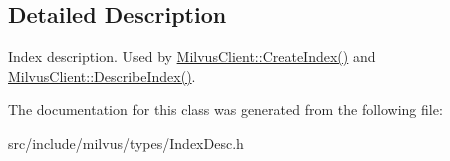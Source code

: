 \subsection{Detailed Description}
Index description. Used by \hyperlink{classmilvus_1_1_milvus_client_a9d56f35a497504a7dee610d368d22b7a}{Milvus\+Client\+::\+Create\+Index()} and \hyperlink{classmilvus_1_1_milvus_client_a58ed7015339719ab8dc7d6acad90d9a1}{Milvus\+Client\+::\+Describe\+Index()}. 

The documentation for this class was generated from the following file\+:\begin{DoxyCompactItemize}
\item 
src/include/milvus/types/Index\+Desc.\+h\end{DoxyCompactItemize}
